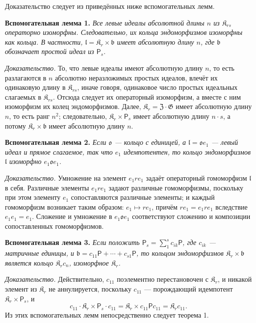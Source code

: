\documentclass[11pt]{article}
\begin{document}
Доказательство следует из приведённых ниже вспомогательных лемм.

\noindent\textbf{Вспомогательная лемма 1.} \emph{Все левые идеалы абсолютной длины \(n\) из \(\mathfrak K_{rs}\) операторно изоморфны. Следовательно, их кольца эндоморфизмов изоморфны как кольца. В частности, \(\mathfrak l=\mathfrak K_r\times\mathfrak b\) имеет абсолютную длину \(n\), где \(\mathfrak b\) обозначает простой идеал из \(\mathsf{P}_s\).}

\noindent\emph{Доказательство.} То, что левые идеалы имеют абсолютную длину \(n\), то есть разлагаются в \(n\) абсолютно неразложимых простых идеалов, влечёт их одинаковую длину в \(\mathfrak K_{rs}\), иначе говоря, одинаковое число простых идеальных слагаемых в \(\mathfrak K_{rs}\). Отсюда следует их операторный изоморфизм, а вместе с ним изоморфизм их колец эндоморфизмов. Далее, \(\mathfrak K_r=\mathfrak Z\cdot\mathfrak G\) имеет абсолютную длину \(n\), то есть ранг \(n^2\); следовательно, \(\mathfrak K_r\times \mathsf{P}_s\) имеет абсолютную длину \(n\cdot s\), а потому \(\mathfrak K_r\times\mathfrak b\) имеет абсолютную длину \(n\).

\noindent\textbf{Вспомогательная лемма 2.} \emph{Если \(\mathfrak o\) --- кольцо с единицей, а \(\mathfrak l=\mathfrak o e_1\) --- левый идеал и прямое слагаемое, так что \(e_1\) идемпотентен, то кольцо эндоморфизмов \(\mathfrak l\) изоморфно \(e_1\mathfrak o e_1\).}

\noindent\emph{Доказательство.} Умножение на элемент \(e_1re_1\) задаёт операторный гомоморфизм \(\mathfrak l\) в себя. Различные элементы \(e_1re_1\) задают различные гомоморфизмы, поскольку при этом элементу \(e_1\) сопоставляются различные элементы; и каждый гомоморфизм возникает таким образом: \(e_1\mapsto re_1\), причём \(re_1=e_1re_1\) вследствие \(e_1e_1=e_1\). Сложение и умножение в \(e_1\mathfrak o e_1\) соответствуют сложению и композиции сопоставленных гомоморфизмов.

\noindent\textbf{Вспомогательная лемма 3.} \emph{Если положить \(\mathsf{P}_s=\sum_1^s c_{ik}\mathsf{P}\), где \(c_{ik}\) --- матричные единицы, и \(\mathfrak b=c_{11}\mathsf{P}+\cdots+c_{s1}\mathsf{P}\), то кольцом эндоморфизмов \(\mathfrak K_r\times\mathfrak b\) является кольцо \(\mathfrak K_rc_n\), изоморфное \(\mathfrak K_r\).}

\noindent\emph{Доказательство.} Действительно, \(c_{11}\) поэлементно перестановочен с \(\mathfrak K_r\), и никакой элемент из \(\mathfrak K_r\) не аннулируется, поскольку \(c_{11}\) --- порождающий идемпотент \(\mathfrak K_r\times \mathsf{P}_s\), и
\[
c_{11}\cdot\mathfrak K_r\times \mathsf{P}_s\cdot c_{11}
=\mathfrak K_r\times c_{11}\mathsf Pc_{11}
=\mathfrak K_rc_{11}.
\]
Из этих вспомогательных лемм непосредственно следует теорема 1.
\end{document}
